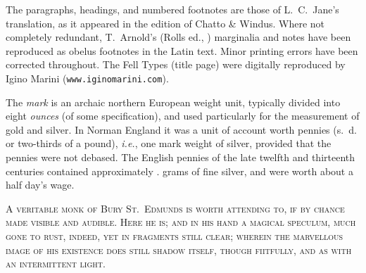 \documentclass[10pt]{book}
\begin{document}
{\begin{center}
{\vspace{.25cm}
{
The paragraphs, headings, and numbered footnotes are those of L.\ C.\ Jane's translation, as it appeared in the  edition of Chatto \& Windus. Where not completely redundant, T.\ Arnold's (Rolls ed., ) marginalia and notes have been reproduced as obelus footnotes in the Latin text. Minor printing errors have been corrected throughout. The Fell Types (title page) were digitally reproduced by Igino Marini (\texttt{www.iginomarini.com}).
}
}

\end{center}


\begin{center}

\hspace{0cm}\vspace{1.0cm}

\parbox{8cm}{

\begin{center}
\end{center}

\vspace{.25cm}
{
The \emph{mark} is an archaic northern European weight unit, typically divided into eight \emph{ounces} (of some specification), and used particularly for the measurement of gold and silver. In Norman England it was a unit of account worth  pennies (s.\ d. or two-thirds of a pound), \emph{i.e.}, one mark weight of silver, provided that the pennies were not debased. The English pennies of the late twelfth and thirteenth centuries contained approximately .\hspace{1pt} grams of fine silver, and were worth about a half day's wage.
}
}

\end{center}





\cleardoublepage

\begin{center}


\hspace{0cm}\vspace{1.4cm}

\parbox{8cm}{
{\scshape
A veritable monk of Bury St.\ Edmunds is worth attending to, if by chance made visible and audible. Here he is; and in his hand a magical speculum, much gone to rust, indeed, yet in fragments still clear; wherein the marvellous image of his existence does still shadow itself, though f\vphantom iitfully, and as with an intermittent light.\\
}

}
\end{center}}
\end{document}
